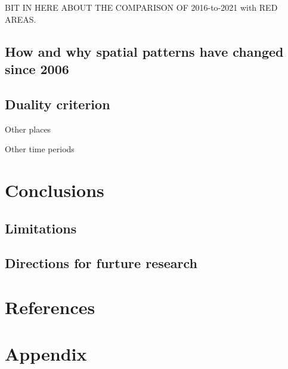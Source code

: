 \documentclass[preprint, 3p,
authoryear]{elsarticle} %
\begin{document}
BIT IN HERE ABOUT THE COMPARISON OF 2016-to-2021 with RED AREAS.

\subsection{How and why spatial patterns have changed since
2006}\label{how-and-why-spatial-patterns-have-changed-since-2006}

\subsection{Duality criterion}\label{duality-criterion}

Other places

Other time periods

\section{Conclusions}\label{conclusions}

\subsection{Limitations}\label{limitations}

\subsection{Directions for furture
research}\label{directions-for-furture-research}

\section*{References}\label{references}

\section{Appendix}\label{appendix}
\end{document}
